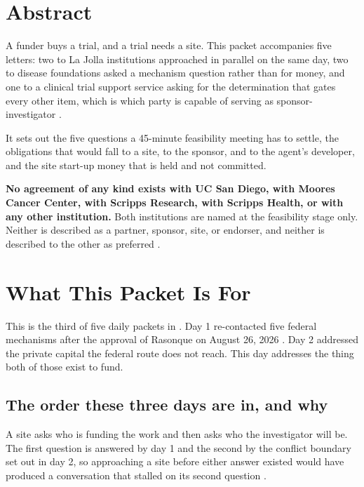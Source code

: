 \section*{Abstract}

A funder buys a trial, and a trial needs a site. This packet accompanies five
letters: two to La Jolla institutions approached in parallel on the same day, two
to disease foundations asked a mechanism question rather than for money, and one
to a clinical trial support service asking for the determination that gates
every other item, which is which party is capable of serving as
sponsor-investigator \cite{ucsdactri2026}.

It sets out the five questions a 45-minute feasibility meeting has to settle, the
obligations that would fall to a site, to the sponsor, and to the agent's
developer, and the site start-up money that is held and not committed.

\textbf{No agreement of any kind exists with UC San Diego, with Moores Cancer
Center, with Scripps Research, with Scripps Health, or with any other
institution.} Both institutions are named at the feasibility stage only. Neither
is described as a partner, sponsor, site, or endorser, and neither is described
to the other as preferred \cite{ucsdmoores2026,scrippsdtc2026}.

\section{What This Packet Is For}

This is the third of five daily packets in
. Day 1 re-contacted five federal mechanisms after the
approval of Rasonque on August 26, 2026 \cite{fdarasonque2026}. Day 2 addressed
the private capital the federal route does not reach. This day addresses the
thing both of those exist to fund.

\subsection{The order these three days are in, and why}

A site asks who is funding the work and then asks who the investigator will be.
The first question is answered by day 1 and the second by the conflict boundary
set out in day 2, so approaching a site before either answer existed would have
produced a conversation that stalled on its second question
\cite{ecfr2026part54}.

